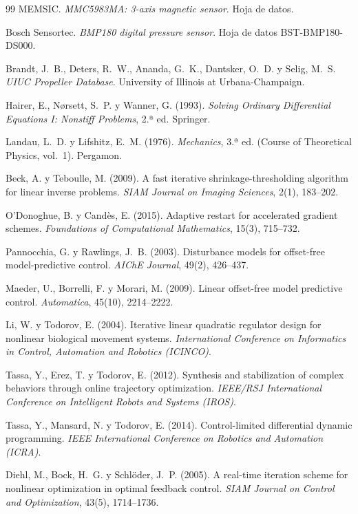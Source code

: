 \begin{thebibliography}{99}
 MEMSIC. \emph{MMC5983MA: 3-axis magnetic sensor}. Hoja de
datos.

 Bosch Sensortec. \emph{BMP180 digital pressure sensor}. Hoja
de datos BST-BMP180-DS000.

 Brandt, J.~B., Deters, R.~W., Ananda, G.~K., Dantsker, O.~D. y
Selig, M.~S. \emph{UIUC Propeller Database}. University of Illinois at
Urbana-Champaign.

 Hairer, E., Nørsett, S.~P. y Wanner, G. (1993).
\emph{Solving Ordinary Differential Equations I: Nonstiff Problems}, 2.ª ed.
Springer.

 Landau, L.~D. y Lifshitz, E.~M. (1976). \emph{Mechanics},
3.ª ed. (Course of Theoretical Physics, vol.~1). Pergamon.

 Beck, A. y Teboulle, M. (2009). A fast iterative
shrinkage-thresholding algorithm for linear inverse problems. \emph{SIAM
Journal on Imaging Sciences}, 2(1), 183--202.

 O'Donoghue, B. y Candès, E. (2015). Adaptive restart
for accelerated gradient schemes. \emph{Foundations of Computational
Mathematics}, 15(3), 715--732.

 Pannocchia, G. y Rawlings, J.~B. (2003). Disturbance
models for offset-free model-predictive control. \emph{AIChE Journal},
49(2), 426--437.

 Maeder, U., Borrelli, F. y Morari, M. (2009). Linear
offset-free model predictive control. \emph{Automatica}, 45(10),
2214--2222.

 Li, W. y Todorov, E. (2004). Iterative linear quadratic
regulator design for nonlinear biological movement systems.
\emph{International Conference on Informatics in Control, Automation and
Robotics (ICINCO)}.

 Tassa, Y., Erez, T. y Todorov, E. (2012). Synthesis and
stabilization of complex behaviors through online trajectory optimization.
\emph{IEEE/RSJ International Conference on Intelligent Robots and Systems
(IROS)}.

 Tassa, Y., Mansard, N. y Todorov, E. (2014).
Control-limited differential dynamic programming. \emph{IEEE International
Conference on Robotics and Automation (ICRA)}.

 Diehl, M., Bock, H.~G. y Schlöder, J.~P. (2005). A
real-time iteration scheme for nonlinear optimization in optimal feedback
control. \emph{SIAM Journal on Control and Optimization}, 43(5),
1714--1736.


\end{thebibliography}
